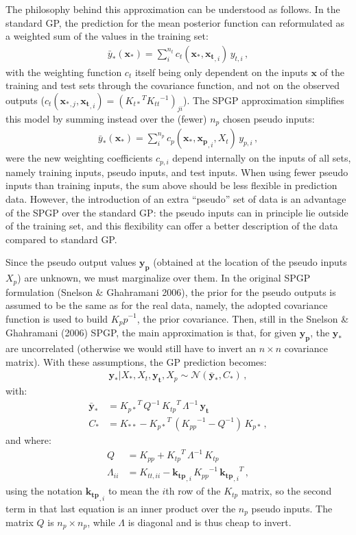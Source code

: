 \documentclass[11pt,a4paper]{article}
\numberwithin{equation}{section}
\begin{document}
The philosophy behind this approximation can be understood as follows. In the standard GP, the prediction for the mean posterior function can reformulated as a weighted sum of the values in the training set:
\begin{align}
\bar{y}_*(\mathbf{x_*}) = \sum_i^{n_t} c_{t}(\mathbf{x_*}, \mathbf{x_t}_{,i})\,y_{t,i}\,,
\end{align}
with the weighting function $c_{t}$ itself being only dependent on the inputs $\mathbf{x}$ of the training and test sets through the covariance function, and not on the observed outputs ($c_{t}(\mathbf{x_*}_{,j}, \mathbf{x_t}_{,i}) = ({K_{t*}}^T {K_{tt}}^{-1})_{ji}$). The SPGP approximation simplifies this model by summing instead over the (fewer) $n_p$ chosen pseudo inputs:
\begin{align}
\bar{y}_*(\mathbf{x_*}) = \sum_i^{n_p} c_{p}(\mathbf{x_*}, \mathbf{x_p}_{,i}, X_t)\,y_{p,i}\,,
\end{align}
were the new weighting coefficients $c_{p,i}$ depend internally on the inputs of all sets, namely training inputs, pseudo inputs, and test inputs. When using fewer pseudo inputs than training inputs, the sum above should be less flexible in prediction data. However, the introduction of an extra ``pseudo'' set of data is an advantage of the SPGP over the standard GP: the pseudo inputs can in principle lie outside of the training set, and this flexibility can offer a better description of the data compared to standard GP.

Since the pseudo output values $\mathbf{y_p}$ (obtained at the location of the pseudo inputs $X_p$) are unknown, we must marginalize over them. In the original SPGP formulation (Snelson \& Ghahramani 2006), the prior for the pseudo outputs is assumed to be the same as for the real data, namely, the adopted covariance function is used to build ${K_pp}^{-1}$, the prior covariance. Then, still in the Snelson \& Ghahramani (2006) SPGP, the main approximation is that, for given $\mathbf{y_p}$, the $\mathbf{y_*}$ are uncorrelated (otherwise we would still have to invert an $n \times n$ covariance matrix). With these assumptions, the GP prediction becomes:
\begin{align}
\mathbf{y_*} | X_*, X_t, \mathbf{y_t}, X_p \sim \mathcal{N}(\mathbf{\bar{y}_*}, C_*)\,,
\end{align}
with:
\begin{align}
\mathbf{\bar{y}_*} &= {K_{p*}}^T\,Q^{-1}\,{K_{tp}}^T\,\Lambda^{-1}\,\mathbf{y_t}\, \label{EQ:spgp_pred_mean} \\
C_* &= K_{**} - {K_{p*}}^T\,({K_{pp}}^{-1} - Q^{-1})\,K_{p*}\,,
\end{align}
and where:
\begin{align}
Q &= K_{pp} + {K_{tp}}^T\,\Lambda^{-1}\,K_{tp}\, \\
\Lambda_{ii} &= K_{tt,ii} - \mathbf{k_{tp}}_{,i}\,{K_{pp}}^{-1}\,{\mathbf{k_{tp}}_{,i}}^T \,,
\end{align}
using the notation $\mathbf{k_{tp}}_{,i}$ to mean the $i$th row of the $K_{tp}$ matrix, so the second term in that last equation is an inner product over the $n_p$ pseudo inputs. The matrix $Q$ is $n_p \times n_p$, while $\Lambda$ is diagonal and is thus cheap to invert.
\end{document}
